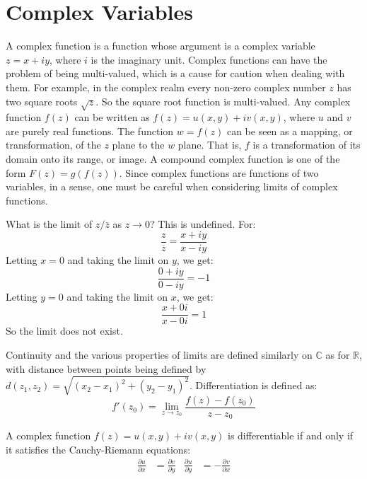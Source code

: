 \section{Complex Variables}
    A complex function is a function whose argument is a complex
    variable $z=x+iy$, where $i$ is the imaginary unit. Complex
    functions can have the problem of being multi-valued, which
    is a cause for caution when dealing with them. For example,
    in the complex realm every non-zero complex number $z$
    has two square roots $\sqrt{z}$. So the square root
    function is multi-valued. Any complex function $f(z)$ can
    be written as $f(z)=u(x,y)+iv(x,y)$, where $u$ and $v$ are
    purely real functions. The function $w=f(z)$ can be seen
    as a mapping, or transformation, of the $z$ plane to
    the $w$ plane. That is, $f$ is a transformation of
    its domain onto its range, or image. A compound complex
    function is one of the form $F(z)=g(f(z))$. Since complex
    functions are functions of two variables, in a sense, one
    must be careful when considering limits of complex functions.
    \begin{example}
        What is the limit of $z/\overline{z}$ as $z\rightarrow{0}$?
        This is undefined. For:
        \begin{equation*}
            \frac{z}{\overline{z}}=\frac{x+iy}{x-iy}
        \end{equation*}
        Letting $x=0$ and taking the limit on $y$,
        we get:
        \begin{equation*}
            \frac{0+iy}{0-iy}=-1
        \end{equation*}
        Letting $y=0$ and taking the limit on $x$,
        we get:
        \begin{equation*}
            \frac{x+0i}{x-0i}=1
        \end{equation*}
        So the limit does not exist.
    \end{example}
    Continuity and the various properties of limits
    are defined similarly on $\mathbb{C}$ as for
    $\mathbb{R}$, with distance between points being
    defined by
    $d(z_{1},z_{2})=\sqrt{(x_{2}-x_{1})^{2}+(y_{2}-y_{1})^{2}}$.
    Differentiation is defined as:
    \begin{equation*}
        f'(z_{0})=\lim_{z\rightarrow{z_{0}}}\frac{f(z)-f(z_{0})}{z-z_{0}}
    \end{equation*}
    \begin{theorem}
        A complex function $f(z)=u(x,y)+iv(x,y)$ is
        differentiable if and only if it satisfies
        the Cauchy-Riemann equations:
        \begin{align*}
            \frac{\partial{u}}{\partial{x}}
            &=\frac{\partial{v}}{\partial{y}}
            &
            \frac{\partial{u}}{\partial{y}}
            &=-\frac{\partial{v}}{\partial{x}}
        \end{align*}
    \end{theorem}
